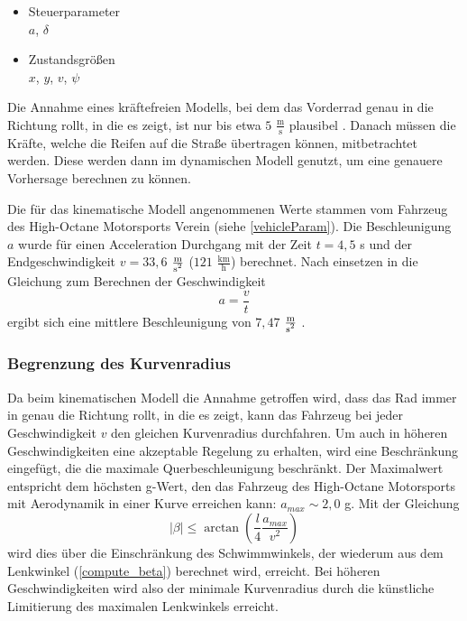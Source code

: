 \documentclass{like}
\begin{document}
\begin{itemize}
	\item Steuerparameter  \\
	\(a\), \(\delta\)
	\item Zustandsgrößen \\
	\(x\), \(y\), \(v\), \(\psi\)
	
\end{itemize}


Die Annahme eines kräftefreien Modells, bei dem das Vorderrad genau in die Richtung rollt, in die es zeigt, ist nur bis etwa $5$ $ \frac{\text{m}}{\text{s}}$ plausibel \cite{rajamani2011vehicle}. Danach müssen die Kräfte, welche die Reifen auf die Straße übertragen können, mitbetrachtet werden. Diese werden dann im dynamischen Modell genutzt, um eine genauere Vorhersage berechnen zu können.

Die für das kinematische Modell angenommenen Werte stammen vom Fahrzeug des High-Octane Motorsports Verein (siehe \ref{vehicleParam}). Die Beschleunigung \(a\) wurde für einen Acceleration Durchgang mit der Zeit $t = 4,5$ s und der Endgeschwindigkeit $v = 33,6$ $\frac{\text{m}}{\text{s\textsuperscript{2}}}$  ($121$  $\frac{\text{km}}{\text{h}}$) berechnet. Nach einsetzen in die Gleichung zum Berechnen der Geschwindigkeit 
\begin{equation}
a = \frac{v}{t}  \label{long_acc_kin}
\end{equation}
ergibt sich eine mittlere Beschleunigung von $7,47$ $ \frac{\text{m}}{\text{s\textsuperscript{2}}}$ .


\subsubsection*{Begrenzung des Kurvenradius}
\label{betaMax}
Da beim kinematischen Modell die Annahme getroffen wird, dass das Rad immer in genau die Richtung rollt, in die es zeigt, kann das Fahrzeug bei jeder Geschwindigkeit \(v\) den gleichen Kurvenradius durchfahren. Um auch in höheren Geschwindigkeiten eine akzeptable Regelung zu erhalten, wird eine Beschränkung eingefügt, die die maximale Querbeschleunigung beschränkt. Der Maximalwert entspricht dem höchsten g-Wert, den das Fahrzeug des High-Octane Motorsports mit Aerodynamik in einer Kurve erreichen kann: $a_{max} \sim 2,0$ g. 
Mit der Gleichung
\begin{equation}
	|\beta| \leq \arctan \left(\frac{l}{4} \frac{a_{max}}{v^2} \right)
\end{equation}
wird dies über die Einschränkung des Schwimmwinkels, der wiederum aus dem Lenkwinkel (\ref{compute_beta}) berechnet wird, erreicht. Bei höheren Geschwindigkeiten wird also der minimale Kurvenradius durch die künstliche Limitierung des maximalen Lenkwinkels erreicht. 
\end{document}
